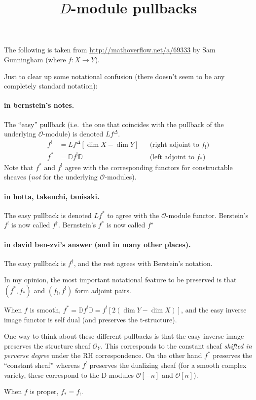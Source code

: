 \documentclass[english, no-theorem-numbers]{short-notes}
\title{\texorpdfstring{$D$}{D}-module pullbacks}
\author{}
\begin{document}
\maketitle

The following is taken from \url{http://mathoverflow.net/a/69333} by Sam Gunningham (where $f\colon X → Y$).

\bigskip
\noindent Just to clear up some notational confusion (there doesn't seem to be any completely standard notation):

\paragraph{in bernstein's notes.}
The \enquote{easy} pullback (i.e.~the one that coincides with the pullback of the underlying $\mathcal O$-module) is denoted $Lf^\Delta$.
\begin{align*}
    f^! & = Lf^\Delta [\dim X - \dim Y] & & \text{(right adjoint to $f_!$)} \\
    f^\ast & = \mathbb D f^! \mathbb D & & \text{(left adjoint to $f_\ast$)}
\end{align*}
Note that $f^\ast$ and $f^!$ agree with the corresponding functors for constructable sheaves (\emph{not} for the underlying $\mathcal O$-modules).

\paragraph{in hotta, takeuchi, tanisaki.}
The easy pullback is denoted $Lf^\ast$ to agree with the $\mathcal O$-module functor.
Berstein's $f^!$ is now called $f^\dagger$.
Bernstein's $f^\ast$ is now called $f^\star$

\paragraph{in david ben-zvi's answer (and in many other places).}
The easy pullback is $f^\dagger$, and the rest agrees with Berstein's notation.

\bigskip
\noindent 
In my opinion, the most important notational feature to be preserved is that $(f^\ast , f_\ast)$ and $(f_! , f^!)$ form adjoint pairs.

When $f$ is smooth, $f^\ast = \mathbb D f^! \mathbb D = f^! [2(\dim Y - \dim X)]$, and the easy inverse image functor is self dual (and preserves the t-structure).

One way to think about these different pullbacks is that the easy inverse image preserves the structure sheaf $\mathcal O_Y$.
This corresponds to the constant sheaf \emph{shifted in perverse degree} under the RH correspondence.
On the other hand $f^\ast$ preserves the \enquote{constant sheaf} whereas $f^!$ preserves the dualizing sheaf (for a smooth complex variety, these correspond to the D-modules $\mathcal O[-n]$ and $\mathcal O[n]$).

When $f$ is proper, $f_* = f_!$.

\end{document}
